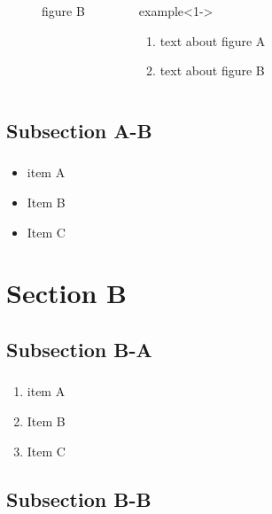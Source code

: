 \documentclass{beamer}
\begin{document}
\begin{frame}
\begin{columns}
\begin{overprint}
\begin{figure}
      \caption{figure B}
      \end{figure}
    \end{overprint}
    \begin{block}{example}<1->
      \begin{enumerate}
        \item<1-|alert@1>
        text about figure A
        \item<2-|alert@2>
        text about figure B
      \end{enumerate}
    \end{block}
  \end{columns}
\end{frame}

\subsection{Subsection A-B}

\begin{frame}
\frametitle{\subsecname}
    \begin{itemize}[<+- | alert@+>]
      \item
      item A
      \item
      Item B
      \item
      Item C
    \end{itemize}
\end{frame}

\section{Section B}

\subsection{Subsection B-A}

\begin{frame}
\frametitle{\subsecname}
    \begin{enumerate}
      \item
      item A
      \item
      Item B
      \item
      Item C
    \end{enumerate}
\end{frame}

\subsection{Subsection B-B}
\end{document}
